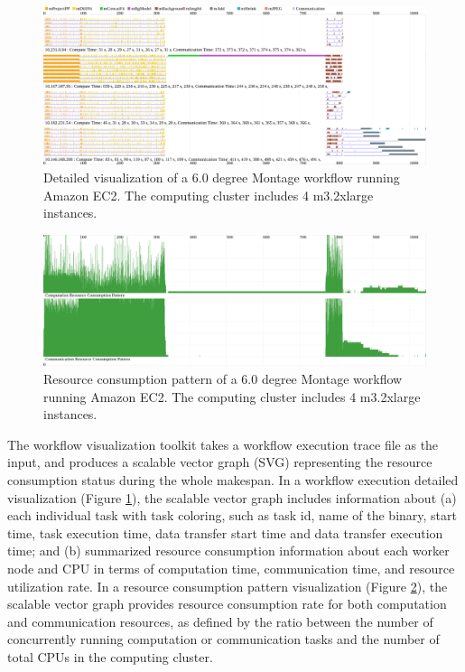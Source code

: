 \begin{figure}[ht]
\centering
\includegraphics[width=16cm]{visual}
\caption{Detailed visualization of a 6.0 degree Montage workflow running Amazon EC2. The computing cluster includes 4 m3.2xlarge instances.}
\label{fig:detail}
\end{figure}

\begin{figure}[ht]
\centering
\includegraphics[width=16cm]{pattern}
\caption{Resource consumption pattern of a 6.0 degree Montage workflow running Amazon EC2. The computing cluster includes 4 m3.2xlarge instances.}
\label{fig:pattern}
\end{figure}



The workflow visualization toolkit takes a workflow execution trace file as the input, and produces a scalable vector graph (SVG) representing the resource consumption status during the whole makespan. In a workflow execution detailed visualization (Figure \ref{fig:detail}), the scalable vector graph includes information about (a) each individual task with task coloring, such as task id, name of the binary, 
start time, task execution time, data transfer start time and data transfer execution time; and (b) summarized resource consumption information about each worker node and CPU in terms of computation time, communication time, and resource utilization rate. In a resource consumption pattern visualization (Figure \ref{fig:pattern}), the scalable vector graph provides resource consumption rate for both computation and communication resources, as defined by the ratio between the number of concurrently running computation or communication tasks and the number of total CPUs in the computing cluster.

